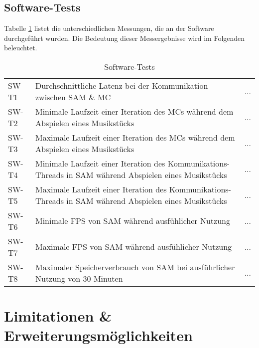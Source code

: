 \subsection{Software-Tests} \label{tests-sw}

Tabelle \ref{table:sw-tests} listet die unterschiedlichen Messungen, die an der Software durchgeführt wurden.
Die Bedeutung dieser Messergebnisse wird im Folgenden beleuchtet.

\begin{table}[htbp]
	\centering
	\begin{tabular}{|l|p{10cm}|l|}
		\theadstart{ID} & \theadcol{Beschreibung} & \theadcol{Ergebnis} \\ \hline
		SW-T1 & Durchschnittliche Latenz bei der Kommunikation zwischen \ac{SAM} \& \ac{MC} & ... \\ \hline
		SW-T2 & Minimale Laufzeit einer Iteration des \ac{MC}s während dem Abspielen eines Musikstücks & ... \\ \hline
		SW-T3 & Maximale Laufzeit einer Iteration des \ac{MC}s während dem Abspielen eines Musikstücks & ... \\ \hline
		SW-T4 & Minimale Laufzeit einer Iteration des Kommunikations-Threads in \ac{SAM} während Abspielen eines Musikstücks & ... \\ \hline
		SW-T5 & Maximale Laufzeit einer Iteration des Kommunikations-Threads in \ac{SAM} während Abspielen eines Musikstücks & ... \\ \hline
		SW-T6 & Minimale \ac{FPS} von \ac{SAM} während ausfühlicher Nutzung & ... \\ \hline
		SW-T7 & Maximale \ac{FPS} von \ac{SAM} während ausfühlicher Nutzung & ... \\ \hline
		SW-T8 & Maximaler Speicherverbrauch von \ac{SAM} bei ausführlicher Nutzung von 30 Minuten & ... \\ \hline
	\end{tabular}
	\caption{Software-Tests}
	\label{table:sw-tests}
\end{table}



\section{Limitationen \& Erweiterungsmöglichkeiten} \label{ergebnisse-limitationen}

